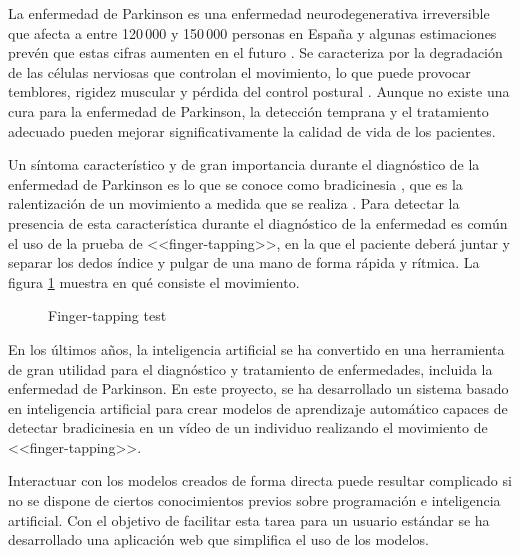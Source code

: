 \label{cha:Introducción}

La enfermedad de Parkinson es una enfermedad neurodegenerativa irreversible que
afecta a entre 120\,000 y 150\,000 personas en España \cite{santos2021present} y
algunas estimaciones prevén que estas cifras aumenten en el futuro
\cite{sen2021futuro}. Se caracteriza por la degradación de las células nerviosas
que controlan el movimiento, lo que puede provocar temblores, rigidez muscular y
pérdida del control postural \cite{eswiki:148845196}. Aunque no existe una cura
para la enfermedad de Parkinson, la detección temprana y el tratamiento adecuado
pueden mejorar significativamente la calidad de vida de los pacientes.

Un síntoma característico y de gran importancia durante el diagnóstico de la
enfermedad de Parkinson es lo que se conoce como bradicinesia
\cite{postuma2015mds}, que es la ralentización de un movimiento a medida que se
realiza \cite{berardelli2001pathophysiology}. Para detectar la presencia de esta
característica durante el diagnóstico de la enfermedad es común el uso de la
prueba de <<finger-tapping>>, en la que el paciente deberá juntar y separar los
dedos índice y pulgar de una mano de forma rápida y rítmica. La figura
\ref{fig:finger-tapping-test} muestra en qué consiste el movimiento.

\begin{figure}[H]
    \centering
    \caption{Finger-tapping test}
    \label{fig:finger-tapping-test}
\end{figure}

En los últimos años, la inteligencia artificial se ha convertido en una
herramienta de gran utilidad para el diagnóstico y tratamiento de enfermedades,
incluida la enfermedad de Parkinson. En este proyecto, se ha desarrollado un
sistema basado en inteligencia artificial para crear modelos de aprendizaje
automático capaces de detectar bradicinesia en un vídeo de un individuo
realizando el movimiento de <<finger-tapping>>.

Interactuar con los modelos creados de forma directa puede resultar complicado
si no se dispone de ciertos conocimientos previos sobre programación e
inteligencia artificial. Con el objetivo de facilitar esta tarea para un usuario
estándar se ha desarrollado una aplicación web que simplifica el uso de los
modelos.

